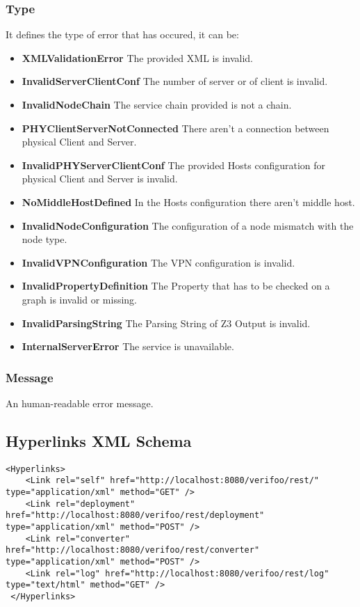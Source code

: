 \documentclass[a4paper,11pt]{article}
\begin{document}
\subsubsection*{Type}
It defines the type of error that has occured, it can be:
\begin{itemize}
    \item \textbf{XMLValidationError} The provided XML is invalid.
	\item \textbf{InvalidServerClientConf} The number of server or of client is invalid.
	\item \textbf{InvalidNodeChain} The service chain provided is not a chain.
	\item \textbf{PHYClientServerNotConnected} There aren't a connection between physical Client and Server.
	\item \textbf{InvalidPHYServerClientConf} The provided Hosts configuration for physical Client and Server is invalid.
	\item \textbf{NoMiddleHostDefined} In the Hosts configuration there aren't middle host.
	\item \textbf{InvalidNodeConfiguration} The configuration of a node mismatch with the node type.
	\item \textbf{InvalidVPNConfiguration} The VPN configuration is invalid.	  \item \textbf{InvalidPropertyDefinition} The Property that has to be checked on a graph is invalid or missing.

	\item \textbf{InvalidParsingString} The Parsing String of Z3 Output is invalid.
	\item \textbf{InternalServerError} The service is unavailable.
\end{itemize}
\subsubsection*{Message}
An human-readable error message.
\newpage
\subsection{Hyperlinks XML Schema}
\begin{lstlisting}[label={list:
twenty-first},caption=Error XML Example]
<Hyperlinks>
    <Link rel="self" href="http://localhost:8080/verifoo/rest/" type="application/xml" method="GET" />
    <Link rel="deployment" href="http://localhost:8080/verifoo/rest/deployment" type="application/xml" method="POST" />
    <Link rel="converter" href="http://localhost:8080/verifoo/rest/converter" type="application/xml" method="POST" />
    <Link rel="log" href="http://localhost:8080/verifoo/rest/log" type="text/html" method="GET" />
 </Hyperlinks>
\end{lstlisting}
\end{document}
